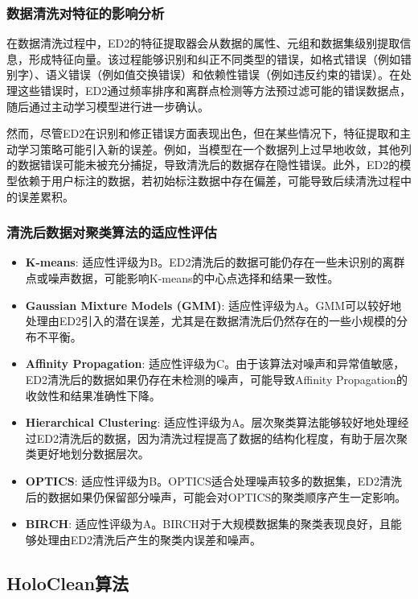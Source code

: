 \documentclass{ctexart} %
\begin{document}
\subsubsection{数据清洗对特征的影响分析}

在数据清洗过程中，ED2的特征提取器会从数据的属性、元组和数据集级别提取信息，形成特征向量。该过程能够识别和纠正不同类型的错误，如格式错误（例如错别字）、语义错误（例如值交换错误）和依赖性错误（例如违反约束的错误）。在处理这些错误时，ED2通过频率排序和离群点检测等方法预过滤可能的错误数据点，随后通过主动学习模型进行进一步确认。

然而，尽管ED2在识别和修正错误方面表现出色，但在某些情况下，特征提取和主动学习策略可能引入新的误差。例如，当模型在一个数据列上过早地收敛，其他列的数据错误可能未被充分捕捉，导致清洗后的数据存在隐性错误。此外，ED2的模型依赖于用户标注的数据，若初始标注数据中存在偏差，可能导致后续清洗过程中的误差累积。

\subsubsection{清洗后数据对聚类算法的适应性评估}
\begin{itemize}
    \item \textbf{K-means}: 适应性评级为B。ED2清洗后的数据可能仍存在一些未识别的离群点或噪声数据，可能影响K-means的中心点选择和结果一致性。
    \item \textbf{Gaussian Mixture Models (GMM)}: 适应性评级为A。GMM可以较好地处理由ED2引入的潜在误差，尤其是在数据清洗后仍然存在的一些小规模的分布不平衡。
    \item \textbf{Affinity Propagation}: 适应性评级为C。由于该算法对噪声和异常值敏感，ED2清洗后的数据如果仍存在未检测的噪声，可能导致Affinity Propagation的收敛性和结果准确性下降。
    \item \textbf{Hierarchical Clustering}: 适应性评级为A。层次聚类算法能够较好地处理经过ED2清洗后的数据，因为清洗过程提高了数据的结构化程度，有助于层次聚类更好地划分数据层次。
    \item \textbf{OPTICS}: 适应性评级为B。OPTICS适合处理噪声较多的数据集，ED2清洗后的数据如果仍保留部分噪声，可能会对OPTICS的聚类顺序产生一定影响。
    \item \textbf{BIRCH}: 适应性评级为A。BIRCH对于大规模数据集的聚类表现良好，且能够处理由ED2清洗后产生的聚类内误差和噪声。
\end{itemize}

\subsection{HoloClean算法}
\end{document}
